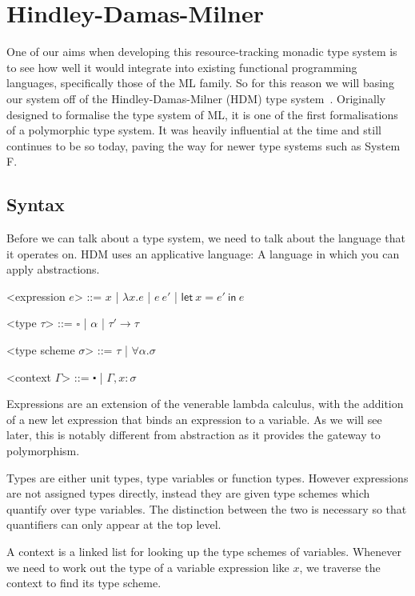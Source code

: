 \section{Hindley-Damas-Milner}

One of our aims when developing this resource-tracking monadic type
system is to see how well it would integrate into existing functional
programming languages, specifically those of the ML family. So for
this reason we will basing our system off of the Hindley-Damas-Milner
(HDM) type system~\cite{damas1982}. Originally designed to formalise
the type system of ML, it is one of the first formalisations of a
polymorphic type system. It was heavily influential at the time and
still continues to be so today, paving the way for newer type systems
such as System F. 

\subsection{Syntax}

Before we can talk about a type system, we need to talk about the
language that it operates on. HDM uses an applicative language: A
language in which you can apply abstractions.
\def\defaultHypSeparation{\hskip .05in}
\newcommand{\letin}[2]{\mathsf{let} \ #1 \ \mathsf{in} \ #2}
\begin{grammar}

  <expression $e$> ::= $x$ | $\lambda x . e$ | $e \ e'$ | $\letin{x=e'}{e}$ %

  <type $\tau$> ::= $\square$ | $\alpha$ | $\tau' \rightarrow \tau$
  
  <type scheme $\sigma$> ::= $\tau$ | $\forall \alpha . \sigma$

  <context $\Gamma$> ::= $\centerdot$ | $\Gamma, x : \sigma$

\end{grammar}
Expressions are an extension of the venerable lambda calculus, with the
addition of a new let expression that binds an expression to a
variable. As we will see later, this is notably different from
abstraction as it provides the gateway to polymorphism.

Types are either unit types, type variables or function types. However
expressions are not assigned types directly, instead they are given
type schemes which quantify over type variables. The distinction
between the two is necessary so that quantifiers can only
appear at the top level. 

A context is a linked list for looking up the type schemes of
variables. Whenever we need to work out the type of a variable
expression like $x$, we traverse the context to find its type scheme.

